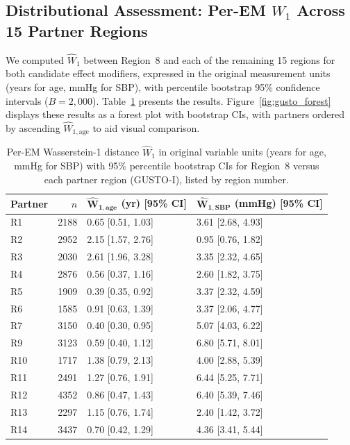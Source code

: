 \documentclass[AMA,Times1COL]{WileyNJDv5}
\begin{document}
\subsection{Distributional Assessment: Per-EM $W_1$ Across 15 Partner Regions}\label{sec:app_nabcd}

We computed $\widehat{W}_1$ between Region~8 and each of the remaining 15 regions for both candidate effect modifiers, expressed in the original measurement units (years for age, mmHg for SBP), with percentile bootstrap 95\% confidence intervals ($B = 2{,}000$). Table~\ref{tab:gusto_nabcd} presents the results. Figure~\ref{fig:gusto_forest} displays these results as a forest plot with bootstrap CIs, with partners ordered by ascending $\widehat{W}_{1,\text{age}}$ to aid visual comparison.

\begin{table}[ht]
\centering
\caption{Per-EM Wasserstein-1 distance $\widehat{W}_1$ in original variable units (years for age, mmHg for SBP) with 95\% percentile bootstrap CIs for Region~8 versus each partner region (GUSTO-I), listed by region number.\label{tab:gusto_nabcd}}
\begin{tabular}{lrll}
\toprule
\textbf{Partner} & $n$ & $\boldsymbol{\widehat{W}_{1,\text{age}}}$ \textbf{(yr) [95\% CI]} & $\boldsymbol{\widehat{W}_{1,\text{SBP}}}$ \textbf{(mmHg) [95\% CI]} \\
\midrule
R1  & 2188 & 0.65 [0.51, 1.03] & 3.61 [2.68, 4.93] \\
R2  & 2952 & 2.15 [1.57, 2.76] & 0.95 [0.76, 1.82] \\
R3  & 2030 & 2.61 [1.96, 3.28] & 3.35 [2.32, 4.65] \\
R4  & 2876 & 0.56 [0.37, 1.16] & 2.60 [1.82, 3.75] \\
R5  & 1909 & 0.39 [0.35, 0.92] & 3.37 [2.32, 4.59] \\
R6  & 1585 & 0.91 [0.63, 1.39] & 3.37 [2.06, 4.77] \\
R7  & 3150 & 0.40 [0.30, 0.95] & 5.07 [4.03, 6.22] \\
R9  & 3123 & 0.59 [0.40, 1.12] & 6.80 [5.71, 8.01] \\
R10 & 1717 & 1.38 [0.79, 2.13] & 4.00 [2.88, 5.39] \\
R11 & 2491 & 1.27 [0.76, 1.91] & 6.44 [5.25, 7.71] \\
R12 & 4352 & 0.86 [0.47, 1.43] & 6.40 [5.39, 7.46] \\
R13 & 2297 & 1.15 [0.76, 1.74] & 2.40 [1.42, 3.72] \\
R14 & 3437 & 0.70 [0.42, 1.29] & 4.36 [3.41, 5.44] \\

\end{tabular}
\end{table}
\end{document}
